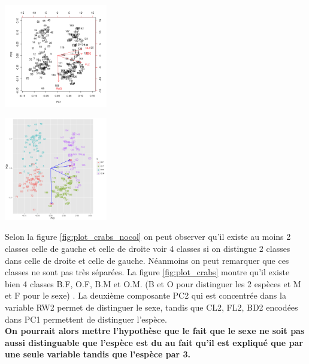 \documentclass[10pt]{article}
\begin{document}
	
			\begin{minipage}{.5\textwidth}
		\includegraphics[width=45mm]{Figures/Crabs2_1/plotnospieces.png}
		\label{fig:plot_crabs_nocol}
	\end{minipage}%
	\hspace{0.02\linewidth}
	\begin{minipage}{.5\textwidth}
		\includegraphics[width=45mm]{Figures/Crabs2_1/plotspieces.png}
		\label{fig:plot_crabs}
	\end{minipage}
	\vspace{0.2mm}
	
	Selon la figure \ref{fig:plot_crabs_nocol} on peut observer qu'il existe au moins 2 classes celle de gauche et celle de droite voir 4 classes si on distingue 2 classes dans celle de droite et celle de gauche. Néanmoins on peut remarquer que ces classes ne sont pas très séparées. La figure \ref{fig:plot_crabs} montre qu'il existe bien 4 classes B.F, O.F, B.M et O.M. (B et O pour distinguer les 2 espèces et M et F pour le sexe) . La deuxième composante PC2 qui est concentrée dans la variable RW2 permet de distinguer le sexe, tandis que CL2, FL2, BD2 encodées dans PC1 permettent de distinguer l'espèce.\\ \textbf{On pourrait alors mettre l'hypothèse  que le fait que le sexe ne soit pas aussi distinguable que l'espèce est du au fait qu'il est expliqué que par une seule variable tandis que l'espèce par 3.}
	
\end{document}
